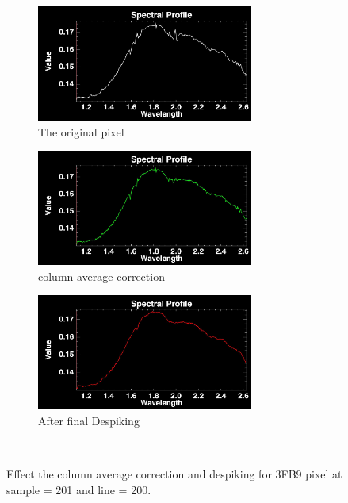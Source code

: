 \documentclass[pdftex, 12pt,a4paper,oneside]{report}
\begin{document}
\begin{figure}[!ht]
        \centering
        \begin{subfigure}[b]{0.2\textwidth}
                \centering
                \includegraphics[width=\textwidth, height=1.5in]{orig3FB9_201_200.jpg}
                \caption{The original pixel}
                \label{fig:origPix_1}
        \end{subfigure}
        \qquad
        \quad
		\begin{subfigure}[b]{0.2\textwidth}
                \centering
                \includegraphics[width=\textwidth, height=1.5in]{avgCorr3FB9_201_200.jpg}
                \caption{column average correction}
                \label{fig:avgCorr_1}
        \end{subfigure}   
        \qquad    
        \quad
        \begin{subfigure}[b]{0.2\textwidth}
                \centering
                \includegraphics[width=\textwidth, height=1.5in]{dspkavgCorr3FB9_201_200.jpg}
                \caption{After final Despiking}
                \label{fig:dspkCorr_1}
        \end{subfigure}%
        ~ 
        
        \caption{Effect the column average correction and despiking for 3FB9 pixel at sample = 201 and line = 200.}
               
\end{figure} 
\end{document}
